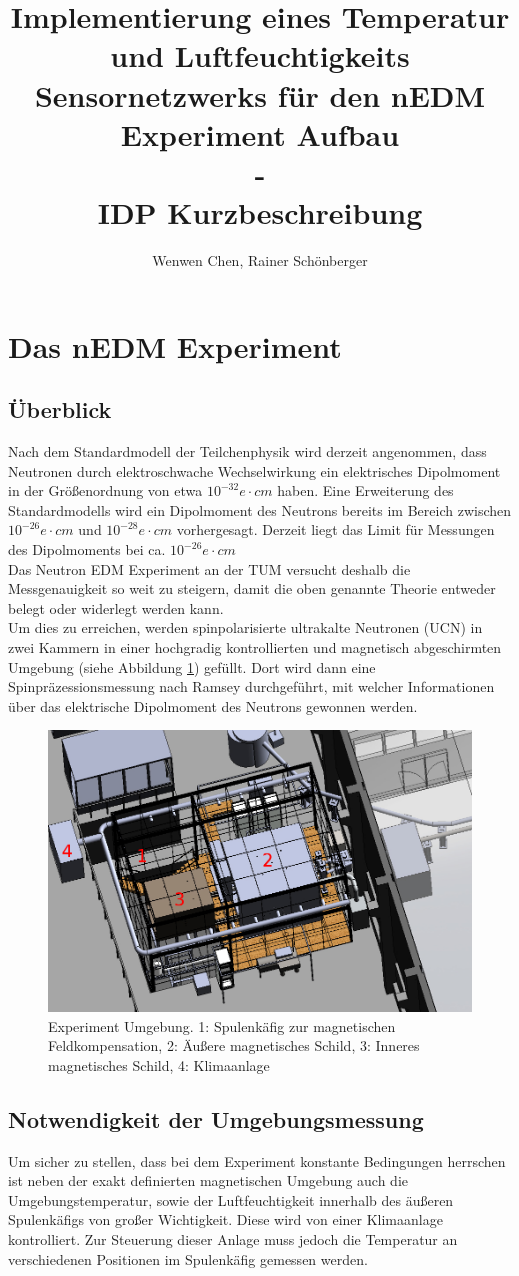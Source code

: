 \documentclass{article} %
\title{Implementierung eines Temperatur und Luftfeuchtigkeits Sensornetzwerks für den nEDM Experiment Aufbau\\-\\IDP Kurzbeschreibung}
\author{Wenwen Chen, Rainer Schönberger}
\begin{document}
\maketitle
\section*{Das nEDM Experiment}
\subsection*{Überblick}
Nach dem Standardmodell der Teilchenphysik wird derzeit angenommen, dass
Neutronen durch elektroschwache Wechselwirkung ein elektrisches Dipolmoment
in der Größenordnung von etwa $10^{-32}e\cdot cm$ haben. Eine Erweiterung des
Standardmodells wird ein Dipolmoment des Neutrons bereits im Bereich zwischen
$10^{-26}e\cdot cm$ und $10^{-28}e\cdot cm$ vorhergesagt. Derzeit liegt das
Limit für Messungen des Dipolmoments bei ca. $10^{-26}e\cdot cm$\\
Das Neutron EDM Experiment an der TUM versucht deshalb die Messgenauigkeit so
weit zu steigern, damit die oben genannte Theorie entweder belegt oder
widerlegt werden kann.\\
Um dies zu erreichen, werden spinpolarisierte ultrakalte Neutronen (UCN) in
zwei Kammern in einer hochgradig kontrollierten und magnetisch abgeschirmten
Umgebung (siehe Abbildung \ref{fig:exp}) gefüllt. Dort wird dann eine
Spin\-präzessions\-messung nach Ramsey
durchgeführt, mit welcher Informationen über das elektrische Dipolmoment des
Neutrons gewonnen werden.
\begin{figure}[h]
\centering
\includegraphics[width=0.7\linewidth]{img/frm3d.png}
\caption{Experiment Umgebung. 1: Spulenkäfig zur magnetischen Feldkompensation,
2: Äußere magnetisches Schild, 3: Inneres magnetisches Schild, 4: Klimaanlage}
\label{fig:exp}
\end{figure}
\subsection*{Notwendigkeit der Umgebungsmessung}
Um sicher zu stellen, dass bei dem Experiment konstante Bedingungen herrschen
ist neben der exakt definierten magnetischen Umgebung auch die 
Umgebungstemperatur, sowie der Luftfeuchtigkeit innerhalb des äußeren
Spulenkäfigs von großer Wichtigkeit. Diese wird von einer Klimaanlage
kontrolliert. Zur Steuerung dieser Anlage muss jedoch die Temperatur an
verschiedenen Positionen im Spulenkäfig gemessen werden.
\end{document}
